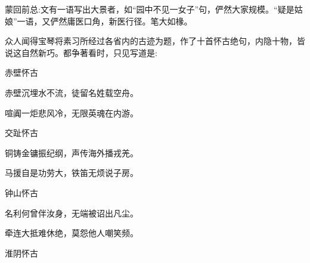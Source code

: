 

\begin{parag}
    \begin{note}蒙回前总:文有一语写出大景者，如“园中不见一女子”句，俨然大家规模。“疑是姑娘”一语，又俨然庸医口角，新医行径。笔大如椽。\end{note}
\end{parag}


\begin{parag}
    众人闻得宝琴将素习所经过各省内的古迹为题，作了十首怀古绝句，内隐十物，皆说这自然新巧。都争著看时，只见写道是:
\end{parag}


\begin{poem}
    \begin{pl}赤壁怀古　\end{pl}

    \begin{pl}赤壁沉埋水不流，徒留名姓载空舟。\end{pl}

    \begin{pl}喧阗一炬悲风冷，无限英魂在内游。\end{pl}

    \emptypl

    \begin{pl}交趾怀古　\end{pl}

    \begin{pl}铜铸金镛振纪纲，声传海外播戎羌。\end{pl}

    \begin{pl}马援自是功劳大，铁笛无烦说子房。\end{pl}

    \emptypl

    \begin{pl}钟山怀古　\end{pl}

    \begin{pl}名利何曾伴汝身，无端被诏出凡尘。\end{pl}

    \begin{pl}牵连大抵难休绝，莫怨他人嘲笑频。\end{pl}

    \emptypl
    \begin{pl}淮阴怀古　\end{pl}


\end{poem}
